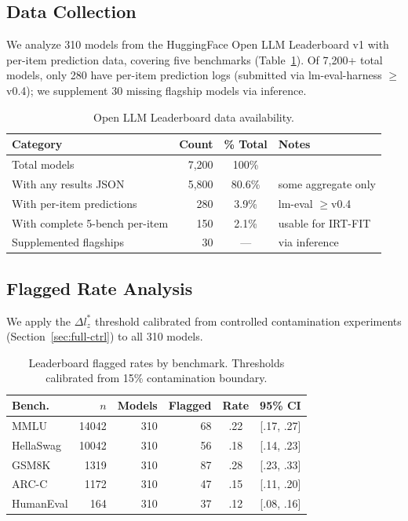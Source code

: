\documentclass[11pt,a4paper]{article}
\begin{document}
\subsection{Data Collection}

We analyze 310 models from the HuggingFace Open LLM Leaderboard v1 with per-item prediction data, covering five benchmarks (Table~\ref{tab:data-avail}).
Of 7,200+ total models, only 280 have per-item prediction logs (submitted via lm-eval-harness $\geq$v0.4); we supplement 30 missing flagship models via inference.

\begin{table}[t]
\centering
\caption{Open LLM Leaderboard data availability.}
\label{tab:data-avail}
\small
\begin{tabular}{lrcl}
\toprule
\textbf{Category} & \textbf{Count} & \textbf{\% Total} & \textbf{Notes} \\
\midrule
Total models                        & 7{,}200  & 100\% & \\
With any results JSON               & 5{,}800  & 80.6\% & some aggregate only \\
With per-item predictions           & 280    & 3.9\%  & lm-eval $\geq$v0.4 \\
With complete 5-bench per-item      & 150    & 2.1\%  & usable for IRT-FIT \\
Supplemented flagships              & 30     & ---    & via inference \\
\bottomrule
\end{tabular}
\end{table}

\subsection{Flagged Rate Analysis}

We apply the $\Delta l_{z}^{*}$ threshold calibrated from controlled contamination experiments (Section~\ref{sec:full-ctrl}) to all 310 models.

\begin{table}[t]
\centering
\caption{Leaderboard flagged rates by benchmark. Thresholds calibrated from 15\% contamination boundary.}
\label{tab:leaderboard-flags}
\small
\begin{tabular}{lrrrcc}
\toprule
\textbf{Bench.} & $n$ & \textbf{Models} & \textbf{Flagged} & \textbf{Rate} & \textbf{95\% CI} \\
\midrule
MMLU      & 14042 & 310 & 68 & .22 & [.17, .27] \\
HellaSwag & 10042 & 310 & 56 & .18 & [.14, .23] \\
GSM8K     & 1319  & 310 & 87 & .28 & [.23, .33] \\
ARC-C     & 1172  & 310 & 47 & .15 & [.11, .20] \\
HumanEval & 164   & 310 & 37 & .12 & [.08, .16] \\
\bottomrule
\end{tabular}
\end{table}
\end{document}
